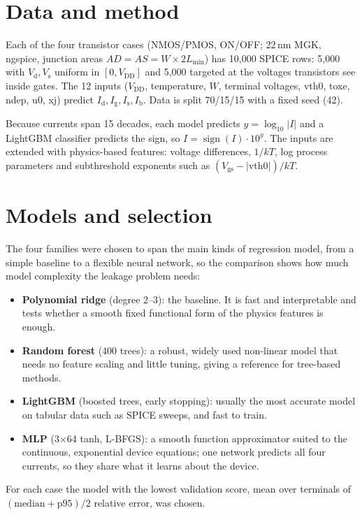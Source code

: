 \documentclass{article}
\begin{document}
\section*{Data and method}
Each of the four transistor cases (NMOS/PMOS, ON/OFF; 22\,nm MGK, ngspice, junction areas
$AD=AS=W\times2L_\mathrm{min}$) has 10,000 SPICE rows: 5,000 with $V_\mathrm{d}, V_\mathrm{s}$ uniform
in $[0,V_\mathrm{DD}]$ and 5,000 targeted at the voltages transistors see inside gates. The 12 inputs
($V_\mathrm{DD}$, temperature, $W$, terminal voltages, vth0, toxe, ndep, u0, xj) predict
$I_\mathrm{d}, I_\mathrm{g}, I_\mathrm{s}, I_\mathrm{b}$. Data is split 70/15/15 with a fixed seed (42).

Because currents span 15 decades, each model predicts $y=\log_{10}|I|$ and a LightGBM classifier
predicts the sign, so $I=\operatorname{sign}(I)\cdot10^{y}$. The inputs are extended with
physics-based features: voltage differences, $1/kT$, log process parameters and subthreshold
exponents such as $(V_\mathrm{gs}-|\mathrm{vth0}|)/kT$.

\section*{Models and selection}
The four families were chosen to span the main kinds of regression model, from a simple baseline
to a flexible neural network, so the comparison shows how much model complexity the leakage
problem needs:
\begin{itemize}
  \item \textbf{Polynomial ridge} (degree 2--3): the baseline. It is fast and interpretable and
        tests whether a smooth fixed functional form of the physics features is enough.
  \item \textbf{Random forest} (400 trees): a robust, widely used non-linear model that needs no
        feature scaling and little tuning, giving a reference for tree-based methods.
  \item \textbf{LightGBM} (boosted trees, early stopping): usually the most accurate model on
        tabular data such as SPICE sweeps, and fast to train.
  \item \textbf{MLP} (3$\times$64 tanh, L-BFGS): a smooth function approximator suited to the
        continuous, exponential device equations; one network predicts all four currents, so they
        share what it learns about the device.
\end{itemize}
For each case the model with the lowest validation score, mean over terminals of
$(\text{median}+\text{p95})/2$ relative error, was chosen.
\end{document}
